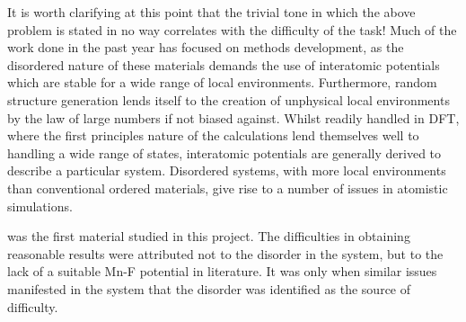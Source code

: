 It is worth clarifying at this point that the trivial tone in which the above problem is stated in no way correlates with the difficulty of the task!
Much of the work done in the past year has focused on methods development, as the disordered nature of these materials demands the use of interatomic potentials which are stable for a wide range of local environments.
Furthermore, random structure generation lends itself to the creation of unphysical local environments by the law of large numbers if not biased against.
Whilst readily handled in DFT, where the first principles nature of the calculations lend themselves well to handling a wide range of states, interatomic potentials are generally derived to describe a particular system.
Disordered systems, with more local environments than conventional ordered materials, give rise to a number of issues in atomistic simulations.

 was the first material studied in this project. 
The difficulties in obtaining reasonable results were attributed not to the disorder in the system, but to the lack of a suitable Mn-F potential in literature.
It was only when similar issues manifested in the  system that the disorder was identified as the source of difficulty. 

